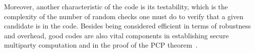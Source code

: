 Moreover, another characteristic of the code is its testability, which is the complexity of the number of random checks one must do to verify that a given candidate is in the code. Besides being considered efficient in terms of robustness and overhead, good codes are also vital components in establishing secure multiparty computation \cite{MultiParty} and in the proof of the PCP theorem~\cite{PCPoriginal}.

